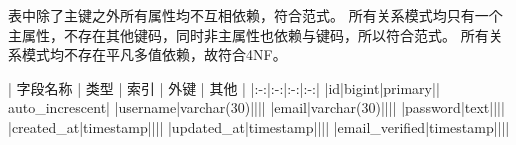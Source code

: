 {}\markdownRendererInterblockSeparator
{}表中除了主键之外所有属性均不互相依赖，符合范式。\markdownRendererInterblockSeparator
{}\markdownRendererInterblockSeparator
{}所有关系模式均只有一个主属性，不存在其他键码，同时非主属性也依赖与键码，所以符合范式。\markdownRendererInterblockSeparator
{}\markdownRendererInterblockSeparator
{}所有关系模式均不存在平凡多值依赖，故符合4NF。\markdownRendererInterblockSeparator
{}\markdownRendererInterblockSeparator
{}\markdownRendererInterblockSeparator
{}\begin{center} | 字段名称 | 类型 | 索引 | 外键 | 其他 | |:-:|:-:|:-:|:-:| |id|bigint|primary|| auto\_increscent| |username|varchar(30)|||| |email|varchar(30)|||| |password|text|||| |created\_at|timestamp|||| |updated\_at|timestamp|||| |email\_verified|timestamp|||| \end{center}\relax